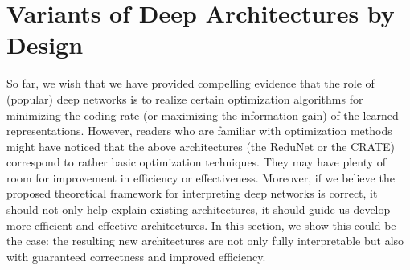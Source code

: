 \documentclass[\toplevelprefix/book-main.tex]{subfiles}
\begin{document}
\begin{table*}[t!]
\centering
\caption{\small Top-1 classification accuracy of \textsc{crate} on various datasets with different model scales 
when pre-trained on ImageNet-1K. For ImageNet-1K/ImageNet-1K ReaL, we directly evaluate the top-1 accuracy. For other datasets, we use models that are pre-trained on ImageNet as initialization and the evaluate the transfer learning performance via fine-tuning.}
\label{tab:crate_comparison_with_sota}
\small
    \setlength{\tabcolsep}{13.6pt}
\end{table*}



\section{Variants of Deep Architectures by Design} \label{sec:chap4-derive-white-box-transformer-variants}

So far, we wish that we have provided compelling evidence that the role of (popular) deep networks is to realize certain optimization algorithms for minimizing the coding rate (or maximizing the information gain) of the learned representations. However, readers who are familiar with optimization methods might have noticed that the above architectures (the ReduNet or the CRATE) correspond to rather basic optimization techniques. They may have plenty of room for improvement in efficiency or effectiveness. Moreover, if we believe the proposed theoretical framework for interpreting deep networks is correct, it should not only help explain existing architectures, it should guide us develop more efficient and effective architectures. In this section, we show this could be the case: the resulting new architectures are not only fully interpretable but also with guaranteed correctness and improved efficiency. 
\end{document}
